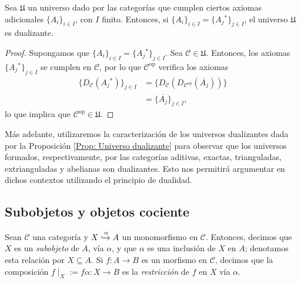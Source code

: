 \documentclass[tesis]{subfiles}
\begin{document}
\begin{Prop}\label{Prop: Universo dualizante}
    Sea $\mathfrak{U}$ un universo dado por las categorías que cumplen ciertos axiomas adicionales $\{A_i\}_{i\in I}$, con $I$ finito. Entonces, si $\{A_i\}_{i\in I} = \{A_j{}^\ast\}_{j\in I}$, el universo $\mathfrak{U}$ es dualizante.
\end{Prop}

\begin{proof}
    Supongamos que $\{A_i\}_{i\in I} = \{A_j{}^\ast\}_{j\in I}$. Sea $\mathscr{C}\in \mathfrak{U}$. Entonces, los axiomas $\{A_j{}^\ast\}_{j\in I}$ se cumplen en $\mathscr{C}$, por lo que $\mathscr{C}^\text{op}$ verifica los axiomas
    \begin{align*}
        \{D_\mathscr{C}(A_j{}^\ast)\}_{j\in I} &= \{D_{\mathscr{C}}(D_{\mathscr{C}^\text{op}}(\overline{A_j}))\} \\
                                               &= \{\overline{A_j}\}_{j\in I},
    \end{align*}
    lo que implica que $\mathscr{C}^\text{op}\in\mathfrak{U}$.
\end{proof}

Más adelante, utilizaremos la caracterización de los universos dualizantes dada por la Proposición \ref{Prop: Universo dualizante} para observar que los universos formados, respectivamente, por las categorías aditivas, exactas, trianguladas, extrianguladas y abelianas son dualizantes. Esto nos permitirá argumentar en dichos contextos utilizando el principio de dualidad.

\subsection*{Subobjetos y objetos cociente} \label{Ssec: Subobjetos y objetos cociente}

\begin{Def}\label{Def: Subobjeto}
    Sean $\mathscr{C}$ una categoría y $X\xhookrightarrow{\alpha} A$ un monomorfismo en $\mathscr{C}$. Entonces, decimos que $X$ es un \emph{subobjeto} de $A$, vía $\alpha$, y que $\alpha$ es una inclusión de $X$ en $A$; denotamos esta relación por $X\subseteq A$. Si $f:A\to B$ es un morfismo en $\mathscr{C}$, decimos que la composición $f\mid_X := f\alpha:X\to B$ es la \emph{restricción} de $f$ en $X$ vía $\alpha$.
\end{Def}
\end{document}
